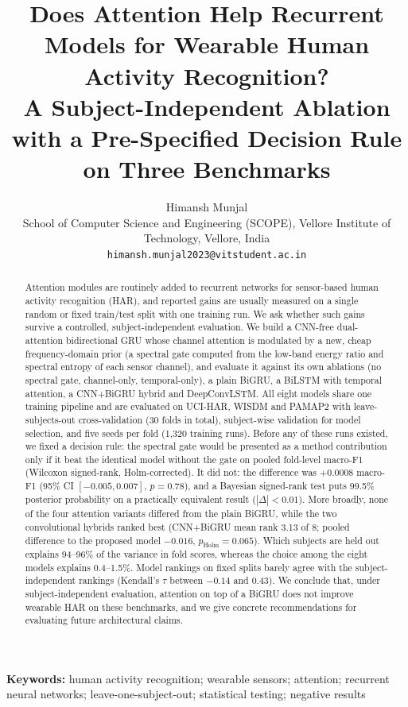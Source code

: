 \documentclass[11pt,a4paper]{article}
\title{Does Attention Help Recurrent Models for Wearable Human Activity Recognition?\\[2pt]
\large A Subject-Independent Ablation with a Pre-Specified Decision Rule on Three Benchmarks}
\author{Himansh Munjal\\
\small School of Computer Science and Engineering (SCOPE), Vellore Institute of Technology, Vellore, India\\
\small \texttt{himansh.munjal2023@vitstudent.ac.in}}
\date{}
\begin{document}
\maketitle

\begin{abstract}
Attention modules are routinely added to recurrent networks for sensor-based human activity recognition (HAR), and reported gains are usually measured on a single random or fixed train/test split with one training run. We ask whether such gains survive a controlled, subject-independent evaluation. We build a CNN-free dual-attention bidirectional GRU whose channel attention is modulated by a new, cheap frequency-domain prior (a spectral gate computed from the low-band energy ratio and spectral entropy of each sensor channel), and evaluate it against its own ablations (no spectral gate, channel-only, temporal-only), a plain BiGRU, a BiLSTM with temporal attention, a CNN+BiGRU hybrid and DeepConvLSTM. All eight models share one training pipeline and are evaluated on UCI-HAR, WISDM and PAMAP2 with leave-subjects-out cross-validation (30 folds in total), subject-wise validation for model selection, and five seeds per fold (1{,}320 training runs). Before any of these runs existed, we fixed a decision rule: the spectral gate would be presented as a method contribution only if it beat the identical model without the gate on pooled fold-level macro-F1 (Wilcoxon signed-rank, Holm-corrected). It did not: the difference was $+0.0008$ macro-F1 (95\% CI $[-0.005, 0.007]$, $p=0.78$), and a Bayesian signed-rank test puts 99.5\% posterior probability on a practically equivalent result ($|\Delta|<0.01$). More broadly, none of the four attention variants differed from the plain BiGRU, while the two convolutional hybrids ranked best (CNN+BiGRU mean rank 3.13 of 8; pooled difference to the proposed model $-0.016$, $p_\text{Holm}=0.065$). Which subjects are held out explains 94--96\% of the variance in fold scores, whereas the choice among the eight models explains 0.4--1.5\%. Model rankings on fixed splits barely agree with the subject-independent rankings (Kendall's $\tau$ between $-0.14$ and $0.43$). We conclude that, under subject-independent evaluation, attention on top of a BiGRU does not improve wearable HAR on these benchmarks, and we give concrete recommendations for evaluating future architectural claims.
\end{abstract}

\noindent\textbf{Keywords:} human activity recognition; wearable sensors; attention; recurrent neural networks; leave-one-subject-out; statistical testing; negative results
\end{document}
